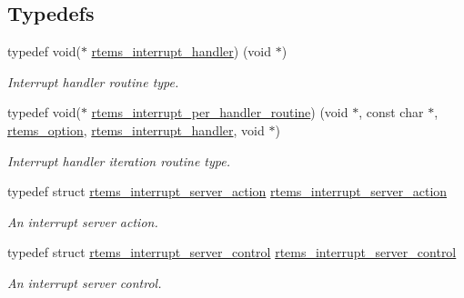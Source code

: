 \subsection*{Typedefs}
\begin{DoxyCompactItemize}
\item 
\mbox{\label{group__rtems__interrupt__extension_gab39bd096ab2c3b41d03dace0e9777b08}} 
typedef void($\ast$ \mbox{\hyperlink{group__rtems__interrupt__extension_gab39bd096ab2c3b41d03dace0e9777b08}{rtems\+\_\+interrupt\+\_\+handler}}) (void $\ast$)
\begin{DoxyCompactList}\small\item\em Interrupt handler routine type. \end{DoxyCompactList}\item 
typedef void($\ast$ \mbox{\hyperlink{group__rtems__interrupt__extension_gad3e88a9acfac97a5021ff98471f5cd71}{rtems\+\_\+interrupt\+\_\+per\+\_\+handler\+\_\+routine}}) (void $\ast$, const char $\ast$, \mbox{\hyperlink{group__ClassicOptions_gad26685eb0e60a9650082935c31920e29}{rtems\+\_\+option}}, \mbox{\hyperlink{group__rtems__interrupt__extension_gab39bd096ab2c3b41d03dace0e9777b08}{rtems\+\_\+interrupt\+\_\+handler}}, void $\ast$)
\begin{DoxyCompactList}\small\item\em Interrupt handler iteration routine type. \end{DoxyCompactList}\item 
typedef struct \mbox{\hyperlink{structrtems__interrupt__server__action}{rtems\+\_\+interrupt\+\_\+server\+\_\+action}} \mbox{\hyperlink{group__rtems__interrupt__extension_ga0349931ca47898d7b89ff3ee09dee2cc}{rtems\+\_\+interrupt\+\_\+server\+\_\+action}}
\begin{DoxyCompactList}\small\item\em An interrupt server action. \end{DoxyCompactList}\item 
typedef struct \mbox{\hyperlink{structrtems__interrupt__server__control}{rtems\+\_\+interrupt\+\_\+server\+\_\+control}} \mbox{\hyperlink{group__rtems__interrupt__extension_ga25f7b3fd5fce7a851fe2f12f8943a0ff}{rtems\+\_\+interrupt\+\_\+server\+\_\+control}}
\begin{DoxyCompactList}\small\item\em An interrupt server control. \end{DoxyCompactList}\end{DoxyCompactItemize}
